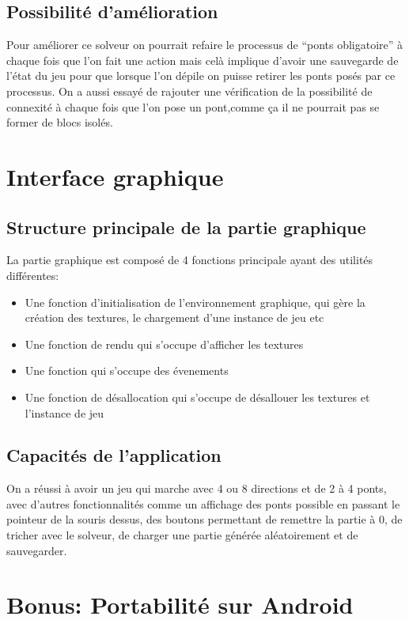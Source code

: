 \documentclass[12pt]{report}
\begin{document}
\section{Possibilité d'amélioration}
Pour améliorer ce solveur on pourrait refaire le processus de ``ponts obligatoire'' à chaque fois que l'on fait une action mais celà implique d'avoir une sauvegarde de l'état du jeu pour que lorsque l'on dépile on puisse retirer les ponts posés par ce processus. On a aussi essayé de rajouter une vérification de la possibilité de connexité à chaque fois que l'on pose un pont,comme ça il ne pourrait pas se former de blocs isolés.
\chapter{Interface graphique}
\section{Structure principale de la partie graphique}
La partie graphique est composé de 4 fonctions principale ayant des utilités différentes:
\begin{itemize}
\item Une fonction d'initialisation de l'environnement graphique, qui gère la création des textures, le chargement d'une instance de jeu etc
\item Une fonction de rendu qui s'occupe d'afficher les textures
\item Une fonction qui s'occupe des évenements
\item Une fonction de désallocation qui s'occupe de désallouer les textures et l'instance de jeu
\end{itemize}

\section{Capacités de l'application}
On a réussi à avoir un jeu qui marche avec 4 ou 8 directions et de 2 à 4 ponts, avec d'autres fonctionnalités comme un affichage des ponts possible en passant le pointeur de la souris dessus, des boutons permettant de remettre la partie à 0, de tricher avec le solveur, de charger une partie générée aléatoirement et de sauvegarder.

\chapter{Bonus: Portabilité sur Android}
\end{document}
